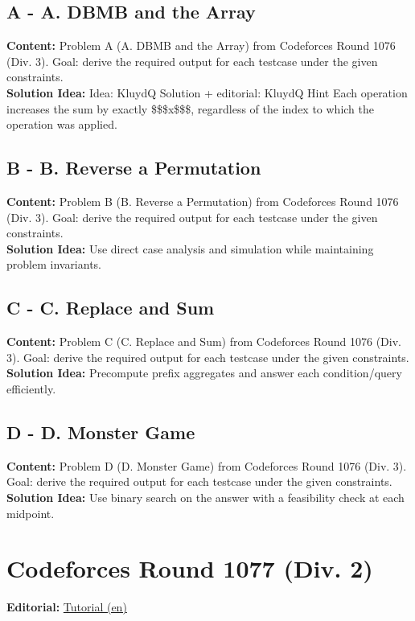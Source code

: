 \documentclass[11pt]{article}
\begin{document}
\subsection{A - A. DBMB and the Array}
\textbf{Content:} Problem A (A. DBMB and the Array) from Codeforces Round 1076 (Div. 3). Goal: derive the required output for each testcase under the given constraints.\\
\textbf{Solution Idea:} Idea: KluydQ Solution + editorial: KluydQ Hint Each operation increases the sum by exactly \$\$\$x\$\$\$, regardless of the index to which the operation was applied.

\subsection{B - B. Reverse a Permutation}
\textbf{Content:} Problem B (B. Reverse a Permutation) from Codeforces Round 1076 (Div. 3). Goal: derive the required output for each testcase under the given constraints.\\
\textbf{Solution Idea:} Use direct case analysis and simulation while maintaining problem invariants.

\subsection{C - C. Replace and Sum}
\textbf{Content:} Problem C (C. Replace and Sum) from Codeforces Round 1076 (Div. 3). Goal: derive the required output for each testcase under the given constraints.\\
\textbf{Solution Idea:} Precompute prefix aggregates and answer each condition/query efficiently.

\subsection{D - D. Monster Game}
\textbf{Content:} Problem D (D. Monster Game) from Codeforces Round 1076 (Div. 3). Goal: derive the required output for each testcase under the given constraints.\\
\textbf{Solution Idea:} Use binary search on the answer with a feasibility check at each midpoint.

\section{Codeforces Round 1077 (Div. 2)}
\textbf{Editorial:} \href{https://codeforces.com/blog/entry/150649}{Tutorial (en)}
\end{document}
